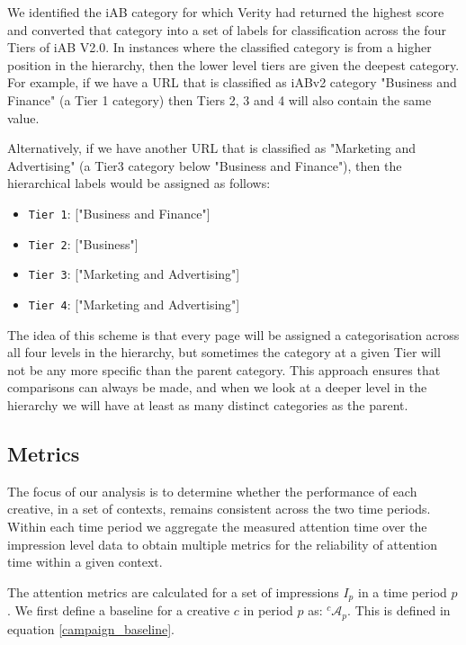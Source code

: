 \documentclass[sigconf]{acmart}
\begin{document}
We identified the iAB category for which Verity had returned the
highest score and converted that category into a set of labels for
classification across the four Tiers of iAB V2.0. In instances where the
classified category is from a higher position in the hierarchy, then the
lower level tiers are given the deepest category. For example, if we have
a URL that is classified as iABv2 category "Business and Finance"
(a Tier 1 category) then Tiers 2, 3 and 4 will also contain the same value.

Alternatively, if we have another URL that is classified as "Marketing and Advertising"
(a Tier3 category below "Business and Finance"), then the hierarchical labels
would be assigned as follows:

\begin{itemize}
    \item {\texttt{Tier 1}}: ["Business and Finance"]
    \item {\texttt{Tier 2}}: ["Business"]
    \item {\texttt{Tier 3}}: ["Marketing and Advertising"]
    \item {\texttt{Tier 4}}: ["Marketing and Advertising"]
\end{itemize}


The idea of this scheme is that every page will be assigned a categorisation across
all four levels in the hierarchy, but sometimes the category at a given Tier
will not be any more specific than the parent category. This approach ensures
that comparisons can always be made, and when we look at a deeper level in the hierarchy
we will have at least as many distinct categories as the parent.

\subsection{Metrics}

The focus of our analysis is to determine whether the performance of each creative,
in a set of contexts, remains consistent across the two time periods.
Within each time period we aggregate
the measured attention time over the impression level data to obtain multiple metrics
for the reliability of attention time within a given context.


The attention metrics are calculated for a set of impressions $I_p$ in a time period $p$.
We first define a baseline for a creative $c$ in period $p$ as:
${}^c\mathcal{A}_p$. This is defined in equation \ref{campaign_baseline}.
\end{document}
